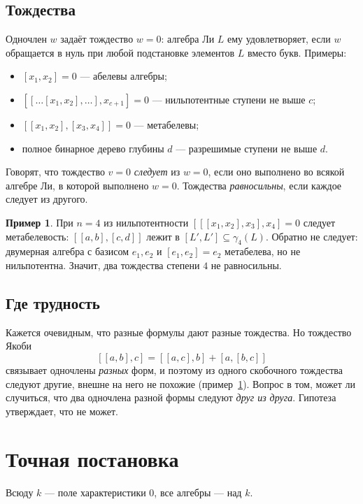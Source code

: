 \documentclass[11pt]{article}
\newcommand{\g}{\gamma}
\theoremstyle{plain}
\theoremstyle{definition}
\newtheorem{example}[theorem]{Пример}
\theoremstyle{remark}
\begin{document}
\subsection{Тождества}

Одночлен $w$ задаёт тождество $w=0$: алгебра Ли $L$ ему удовлетворяет, если $w$ обращается в нуль при любой подстановке элементов $L$ вместо букв. Примеры:
\begin{itemize}
\item $[x_1,x_2]=0$ --- абелевы алгебры;
\item $[[\dots[x_1,x_2],\dots],x_{c+1}]=0$ --- нильпотентные ступени не выше $c$;
\item $[[x_1,x_2],[x_3,x_4]]=0$ --- метабелевы;
\item полное бинарное дерево глубины $d$ --- разрешимые ступени не выше $d$.
\end{itemize}

Говорят, что тождество $v=0$ \emph{следует} из $w=0$, если оно выполнено во всякой алгебре Ли, в которой выполнено $w=0$. Тождества \emph{равносильны}, если каждое следует из другого.

\begin{example}\label{ex:n4}
При $n=4$ из нильпотентности $[[[x_1,x_2],x_3],x_4]=0$ следует метабелевость: $[[a,b],[c,d]]$ лежит в $[L',L']\subseteq\g_4(L)$. Обратно не следует: двумерная алгебра с базисом $e_1,e_2$ и $[e_1,e_2]=e_2$ метабелева, но не нильпотентна. Значит, два тождества степени $4$ не равносильны.
\end{example}

\subsection{Где трудность}

Кажется очевидным, что разные формулы дают разные тождества. Но тождество Якоби
\[ [[a,b],c]=[[a,c],b]+[a,[b,c]] \]
связывает одночлены \emph{разных} форм, и поэтому из одного скобочного тождества следуют другие, внешне на него не похожие (пример~\ref{ex:n4}). Вопрос в том, может ли случиться, что два одночлена разной формы следуют \emph{друг из друга}. Гипотеза утверждает, что не может.

\section{Точная постановка}

Всюду $k$ --- поле характеристики $0$, все алгебры --- над $k$.
\end{document}
